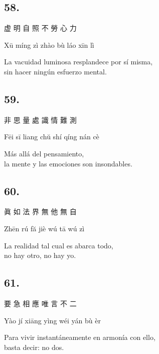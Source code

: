 \documentclass[
  a5paperpaper,
]{article}
\begin{document}
\begin{verseblock}

\hypertarget{section-132}{%
\subsection{58.}\label{section-132}}

虚 明 自 照 不 勞 心 力

Xū míng zì zhào bù láo xīn lì

La vacuidad luminosa resplandece por sí misma,\\
sin hacer ningún esfuerzo mental.

\end{verseblock}

\begin{verseblock}

\hypertarget{section-133}{%
\subsection{59.}\label{section-133}}

非 思 量 處 識 情 難 測

Fēi sī liang chŭ shí qíng nán cè

Más allá del pensamiento,\\
la mente y las emociones son insondables.

\end{verseblock}

\begin{verseblock}

\hypertarget{section-134}{%
\subsection{60.}\label{section-134}}

眞 如 法 界 無 他 無 自

Zhēn rú fă jiè wú tā wú zì

La realidad tal cual es abarca todo,\\
no hay otro, no hay yo.

\end{verseblock}

\begin{verseblock}

\hypertarget{section-135}{%
\subsection{61.}\label{section-135}}

要 急 相 應 唯 言 不 二

Yào jí xiāng yìng wéi yán bù èr

Para vivir instantáneamente en armonía con ello,\\
basta decir: no dos.

\end{verseblock}
\end{document}
